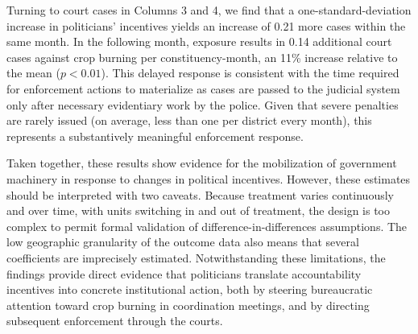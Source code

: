 \documentclass[12pt]{article}
\begin{document}
Turning to court cases in Columns 3 and 4, we find that a one-standard-deviation increase in politicians' incentives yields an increase of 0.21 more cases within the same month. In the following month,  exposure results in 0.14 additional court cases against crop burning per constituency-month, an 11\% increase relative to the mean ($p<0.01$). This delayed response is consistent with the time required for enforcement actions to materialize as cases are passed to the judicial system only after necessary evidentiary work by the police. Given that severe penalties are rarely issued (on average, less than one per district every month), this represents a substantively meaningful enforcement response.


Taken together, these results show evidence for the mobilization of government machinery in response to changes in political incentives. However, these estimates should be interpreted with two caveats. Because treatment varies continuously and over time, with units switching in and out of treatment, the design is too complex to permit formal validation of difference-in-differences assumptions. The low geographic granularity of the outcome data also means that several coefficients are imprecisely estimated. Notwithstanding these limitations, the findings provide direct evidence that politicians translate accountability incentives into concrete institutional action, both by steering bureaucratic attention toward crop burning in coordination meetings, and by directing subsequent enforcement through the courts.
\end{document}
